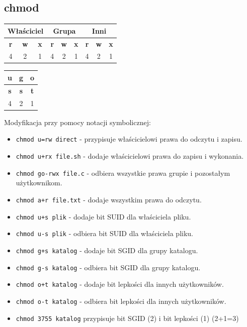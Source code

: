 \documentclass{article}
\begin{document}
\subsection{chmod}
\begin{table}[ht]
\centering
\begin{tabular}{|c|c|c|c|c|c|c|c|c|}
\hline
\multicolumn{3}{|c|}{\textbf{Właściciel}} & \multicolumn{3}{c|}{\textbf{Grupa}} & \multicolumn{3}{c|}{\textbf{Inni}} \\
\hline
\textbf{r} & \textbf{w} & \textbf{x} & \textbf{r} & \textbf{w} & \textbf{x} & \textbf{r} & \textbf{w} & \textbf{x} \\
\hline
4 & 2 & 1 & 4 & 2 & 1 & 4 & 2 & 1 \\
\hline
\end{tabular}
\end{table}
\begin{table}[ht]
    \centering
    \begin{tabular}{|c|c|c|}
    \hline
    \textbf{u} & \textbf{g} & \textbf{o} \\
    \hline
    \textbf{s} & \textbf{s} & \textbf{t} \\
    \hline
    4 & 2 & 1 \\
    \hline
\end{tabular}
\end{table}

Modyfikacja przy pomocy notacji symbolicznej:
\begin{itemize}
    \item \texttt{chmod u=rw direct} - przypisuje właścicielowi prawa do odczytu i zapisu.
    \item \texttt{chmod u+rx file.sh} - dodaje właścicielowi prawa do zapisu i wykonania.
    \item \texttt{chmod go-rwx file.c} - odbiera wszystkie prawa grupie i pozostałym użytkownikom.
    \item \texttt{chmod a+r file.txt} - dodaje wszystkim prawa do odczytu.
    \item \texttt{chmod u+s plik} - dodaje bit SUID dla właściciela pliku.
    \item \texttt{chmod u-s plik} - odbiera bit SUID dla właściciela pliku.
    \item \texttt{chmod g+s katalog} - dodaje bit SGID dla grupy katalogu.
    \item \texttt{chmod g-s katalog} - odbiera bit SGID dla grupy katalogu.
    \item \texttt{chmod o+t katalog} - dodaje bit lepkości dla innych użytkowników.
    \item \texttt{chmod o-t katalog} - odbiera bit lepkości dla innych użytkowników.
    \item \texttt{chmod 3755 katalog} przypisuje bit SGID (2) i bit lepkości (1) (2+1=3)
\end{itemize}
\end{document}
